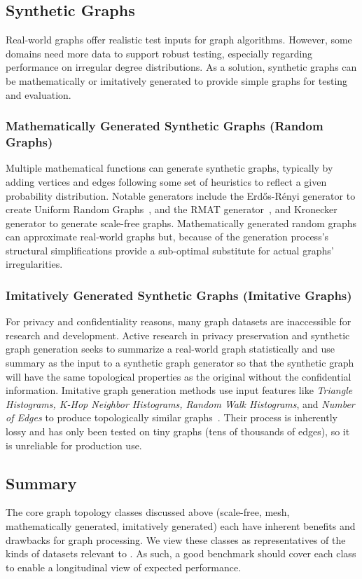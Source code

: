 \subsection{Synthetic Graphs}
Real-world graphs offer realistic test inputs for graph algorithms.
However, some domains need more data to support robust testing, especially regarding performance on irregular degree distributions. 
As a solution, synthetic graphs can be mathematically or imitatively generated to provide simple graphs for testing and evaluation. 


\subsubsection{Mathematically Generated Synthetic Graphs (Random Graphs)}
Multiple mathematical functions can generate synthetic graphs, typically by adding vertices and edges following some set of heuristics to reflect a given probability distribution.
Notable generators include the Erd\H{o}s-R\'enyi generator to create Uniform Random Graphs~\cite{Erdhos1960}, and the \ac{RMAT} generator~\cite{Chakrabarti2004}, and Kronecker~\cite{Leskovec2010} generator to generate scale-free graphs.
Mathematically generated random graphs can approximate real-world graphs but, because of the generation process's structural simplifications provide a sub-optimal substitute for actual graphs' irregularities. 

\subsubsection{Imitatively Generated Synthetic Graphs (Imitative Graphs)}
For privacy and confidentiality reasons, many graph datasets are inaccessible for research and development. 
Active research in privacy preservation and synthetic graph generation seeks to summarize a real-world graph statistically and use summary as the input to a synthetic graph generator so that the synthetic graph will have the same topological properties as the original without the confidential information. 
Imitative graph generation methods use input features like \textit{Triangle Histograms, K-Hop Neighbor Histograms, Random Walk Histograms}, and \textit{Number of Edges} to produce topologically similar graphs~\cite{Zahirnia2024}.
Their process is inherently lossy and has only been tested on tiny graphs (tens of thousands of edges), so it is unreliable for production use.

\subsection{Summary}

The core graph topology classes discussed above (scale-free, mesh, mathematically generated, imitatively generated) each have inherent benefits and drawbacks for graph processing. 
We view these classes as representatives of the kinds of datasets relevant to \gai. 
As such, a good \gai benchmark should cover each class to enable a longitudinal view of expected performance.